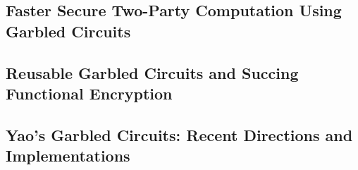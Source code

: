 \cite{VMCrypt}

\subsection{Faster Secure Two-Party Computation Using Garbled Circuits}
\label{sec:faster-secure-two}

\cite{FasterCircuits}

\subsection{Reusable Garbled Circuits and Succing Functional Encryption}
\label{sec:reus-garbl-circ}

\cite{ReusableGC}

\subsection{Yao's Garbled Circuits: Recent Directions and
  Implementations}
\label{sec:yaos-garbl-circ}

\cite{GCRecent}

